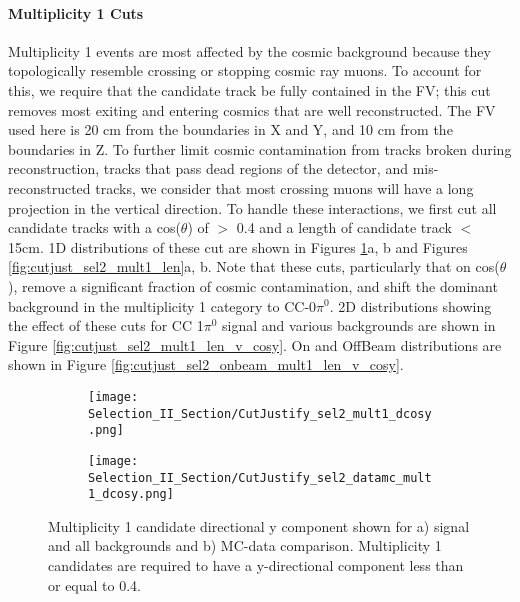 \paragraph{Multiplicity 1 Cuts}
Multiplicity 1 events are most affected by the cosmic background because they topologically resemble crossing or stopping cosmic ray muons. To account for this, we require that the candidate track be fully contained in the FV; this cut removes most exiting and entering cosmics that are well reconstructed. The FV used here is 20 cm from the boundaries in X and Y, and 10 cm from the boundaries in Z. To further limit cosmic contamination from tracks broken during reconstruction, tracks that pass dead regions of the detector, and mis-reconstructed tracks, we consider that most crossing muons will have a long projection in the vertical direction.  To handle these interactions, we first cut all candidate tracks with a cos($\theta$) of $>$ 0.4 and a length of candidate track $<$ 15cm. 1D distributions of these cut are shown in Figures \ref{fig:cutjust_sel2_mult1_cosy}a, b and Figures \ref{fig:cutjust_sel2_mult1_len}a, b. Note that these cuts, particularly that on cos($\theta$), remove a significant fraction of cosmic contamination, and shift the dominant background in the multiplicity 1 category to CC-0$\pi^0$. 2D distributions showing the effect of these cuts for CC 1$\pi^0$ signal and various backgrounds are shown in Figure \ref{fig:cutjust_sel2_mult1_len_v_cosy}. On and OffBeam distributions are shown in Figure \ref{fig:cutjust_sel2_onbeam_mult1_len_v_cosy}. 

\begin{figure}[H]
\centering
  \begin{subfigure}[t]{0.4\textwidth}
    \centering
\texttt{[image: Selection\_II\_Section/CutJustify\_sel2\_mult1\_dcosy.png]}
    \caption{ }
  \end{subfigure} 
  \hspace{20mm}
  \begin{subfigure}[t]{0.4\textwidth}
    \centering
\texttt{[image: Selection\_II\_Section/CutJustify\_sel2\_datamc\_mult1\_dcosy.png]}
    \caption{ }
  \end{subfigure} 
\caption{Multiplicity 1 candidate directional y component shown for a) signal and all backgrounds and b) MC-data comparison.  Multiplicity 1 candidates are required to have a y-directional component less than or equal to 0.4. }
\label{fig:cutjust_sel2_mult1_cosy}
\end{figure}

